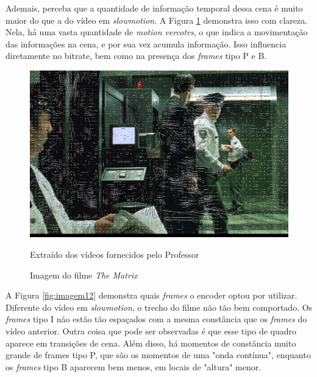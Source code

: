 \paragrafo Ademais, perceba que a quantidade de informação temporal dessa cena é muito maior do que a do vídeo em \textit{slowmotion}. A Figura \ref{fig:imagem11} demonstra isso com clareza. Nela, há uma vasta quantidade de \textit{motion vercotrs}, o que indica a movimentação das informações na cena, e por sua vez acumula informação. Isso influencia diretamente no bitrate, bem como na presença dos \textit{frames} tipo P e B.

\begin{figure}[H]
    \centering
    \caption{Imagem do filme \textit{The Matrix}}
    \label{fig:imagem11}
    
    \includegraphics[scale=0.3]{Documeto/1-ElementosTextuais/images/11.png}

    \small
    Extraído dos vídeos fornecidos pelo Professor
\end{figure}

\paragrafo A Figura \ref{fig:imagem12} demonstra quais \textit{frames} o encoder optou por utilizar. Diferente do vídeo em \textit{slowmotion}, o trecho do filme não tão bem comportado. Os \textit{frames} tipo I não estão tão espaçados com a mesma constância que os \textit{frames} do vídeo anterior. Outra coisa que pode ser observadas é que esse tipo de quadro aparece em transições de cena. Além disso, há momentos de constância muito grande de frames tipo P, que são os momentos de uma "onda contínua", enquanto os \textit{frames} tipo B aparecem bem menos, em locais de "altura" menor. 

